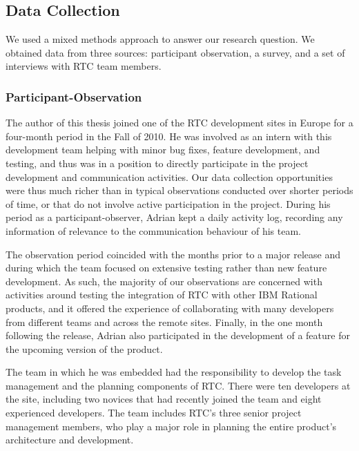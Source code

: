 \subsection{Data Collection}
We used a mixed methods approach to answer our research question. We obtained data from three sources: participant observation, a survey, and a set of interviews with RTC team members.

\subsubsection{Participant-Observation}
The  author of this thesis joined one of the RTC development sites in Europe for a four-month period in the Fall of 2010. He was involved as an intern with this development team helping with minor bug fixes, feature development, and testing, and thus was in a position to directly participate in the project development and communication activities. Our data collection opportunities were thus much richer than in typical observations conducted over shorter periods of time, or that do not involve active participation in the project.  During his period as a participant-observer, Adrian kept a daily activity log, recording any information of relevance to the communication behaviour of his team.

The observation period coincided with the months prior to a major release and during which the team focused on extensive testing rather than new feature development. As such, the majority of our observations are concerned with activities around testing the integration of RTC with other IBM Rational products, and it offered the experience of collaborating with many developers from different teams and across the remote sites. Finally, in the one month following the release, Adrian also participated in the development of a feature for the upcoming version of the product.

The team in which he was embedded had the responsibility to develop the task management and the planning components of RTC. There were ten developers at the site, including two novices that had recently joined the team and eight experienced developers. The team includes RTC's three senior project management members, who play a major role in planning the entire product's architecture and development.


